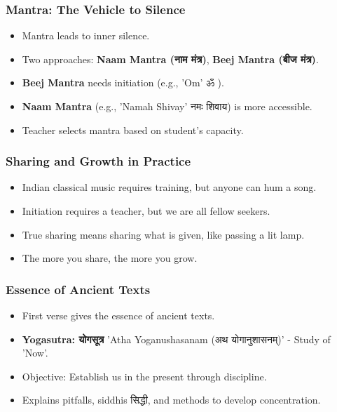 \begin{frame}[fragile]\frametitle{Mantra: The Vehicle to Silence}
      \begin{itemize}
        \item Mantra leads to inner silence.
        \item Two approaches: \textbf{Naam Mantra (नाम मंत्र)}, \textbf{Beej Mantra (बीज मंत्र)}.
        \item \textbf{Beej Mantra} needs initiation (e.g., 'Om' ॐ ).
        \item \textbf{Naam Mantra} (e.g., 'Namah Shivay' नमः शिवाय) is more accessible.
        \item Teacher selects mantra based on student's capacity.
      \end{itemize}
\end{frame}

\begin{frame}[fragile]\frametitle{Sharing and Growth in Practice}
      \begin{itemize}
        \item Indian classical music requires training, but anyone can hum a song.
        \item Initiation requires a teacher, but we are all fellow seekers.
        \item True sharing means sharing what is given, like passing a lit lamp.
        \item The more you share, the more you grow.
      \end{itemize}
\end{frame}

\begin{frame}[fragile]\frametitle{Essence of Ancient Texts}
      \begin{itemize}
        \item First verse gives the essence of ancient texts.
        \item \textbf{Yogasutra: योगसूत्र } 'Atha Yoganushasanam (अथ योगानुशासनम्)' - Study of 'Now'.
        \item Objective: Establish us in the present through discipline.
        \item Explains pitfalls, siddhis सिद्धी, and methods to develop concentration.
      \end{itemize}
\end{frame}

